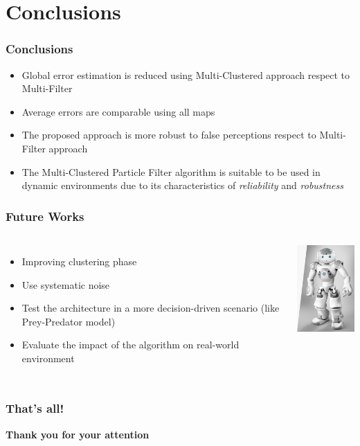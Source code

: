 \section{Conclusions}

\begin{frame}
	\frametitle{Conclusions}
		\begin{itemize}
			\item Global error estimation is reduced using Multi-Clustered approach respect to Multi-Filter
			\item Average errors are comparable using all maps
			\item The proposed approach is more robust to false perceptions respect to Multi-Filter approach
			\item The Multi-Clustered Particle Filter algorithm is suitable to be used in dynamic environments due to its
				  characteristics of \emph{reliability} and \emph{robustness}
		\end{itemize}
\end{frame}

\begin{frame}
	\frametitle{Future Works}
	\begin{columns}[T]
		
		\begin{itemize}
			\item Improving clustering phase
			\item Use systematic noise
			\item Test the architecture in a more decision-driven scenario (like Prey-Predator model)
			\item Evaluate the impact of the algorithm on real-world environment
		\end{itemize}
		
		\centering
		\includegraphics[width=3cm]{Figures/Nao.jpg}
	\end{columns}
\end{frame}

\begin{frame}
	\frametitle{That's all!}
	\begin{center}
		\Large{\textbf{Thank you for your attention}}
	\end{center}
\end{frame}
